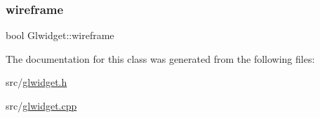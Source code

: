 \subsubsection{\texorpdfstring{wireframe}{wireframe}}
{\footnotesize\ttfamily bool Glwidget\+::wireframe}



The documentation for this class was generated from the following files\+:\begin{DoxyCompactItemize}
\item 
src/\mbox{\hyperlink{glwidget_8h}{glwidget.\+h}}\item 
src/\mbox{\hyperlink{glwidget_8cpp}{glwidget.\+cpp}}\end{DoxyCompactItemize}
